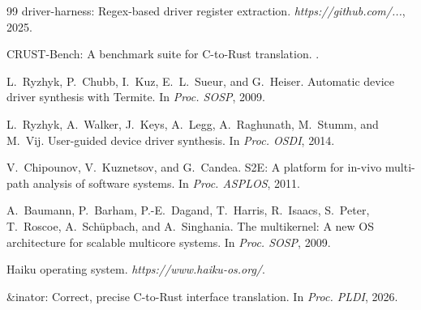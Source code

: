 \documentclass[sigconf,review]{acmart}
\begin{document}
\begin{thebibliography}{99}
\newblock driver-harness: Regex-based driver register extraction.
\newblock \emph{https://github.com/...}, 2025.

\newblock CRUST-Bench: A benchmark suite for C-to-Rust translation.
.

L.~Ryzhyk, P.~Chubb, I.~Kuz, E.~L.~Sueur, and G.~Heiser.
\newblock Automatic device driver synthesis with Termite.
\newblock In \emph{Proc. SOSP}, 2009.

L.~Ryzhyk, A.~Walker, J.~Keys, A.~Legg, A.~Raghunath, M.~Stumm, and M.~Vij.
\newblock User-guided device driver synthesis.
\newblock In \emph{Proc. OSDI}, 2014.

V.~Chipounov, V.~Kuznetsov, and G.~Candea.
\newblock S2E: A platform for in-vivo multi-path analysis of software systems.
\newblock In \emph{Proc. ASPLOS}, 2011.

A.~Baumann, P.~Barham, P.-E.~Dagand, T.~Harris, R.~Isaacs, S.~Peter, T.~Roscoe, A.~Schüpbach, and A.~Singhania.
\newblock The multikernel: A new OS architecture for scalable multicore systems.
\newblock In \emph{Proc. SOSP}, 2009.

\newblock Haiku operating system.
\newblock \emph{https://www.haiku-os.org/}.

\newblock \&inator: Correct, precise C-to-Rust interface translation.
\newblock In \emph{Proc. PLDI}, 2026.

\end{thebibliography}
\end{document}
